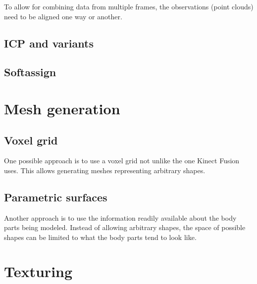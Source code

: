 To allow for combining data from multiple frames, the observations (point clouds) need to be aligned one way or another.


\subsection{ICP and variants}


\subsection{Softassign}

\section{Mesh generation}


\subsection{Voxel grid}

One possible approach is to use a voxel grid not unlike the one Kinect Fusion \citep{} uses. This allows generating meshes representing arbitrary shapes.

\subsection{Parametric surfaces}

Another approach is to use the information readily available about the body parts being modeled. Instead of allowing arbitrary shapes, the space of possible shapes can be limited to what the body parts tend to look like.

\section{Texturing}


